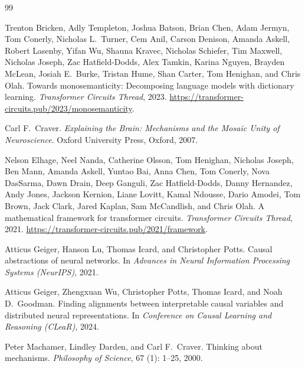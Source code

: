 \documentclass[11pt]{article}
\theoremstyle{remark}
\begin{document}

\begin{thebibliography}{99}

Trenton Bricken, Adly Templeton, Joshua Batson, Brian Chen, Adam Jermyn,
  Tom Conerly, Nicholas L.\ Turner, Cem Anil, Carson Denison, Amanda Askell,
  Robert Lasenby, Yifan Wu, Shauna Kravec, Nicholas Schiefer, Tim Maxwell,
  Nicholas Joseph, Zac Hatfield-Dodds, Alex Tamkin, Karina Nguyen, Brayden
  McLean, Josiah E.\ Burke, Tristan Hume, Shan Carter, Tom Henighan, and
  Chris Olah.
\newblock Towards monosemanticity: Decomposing language models with dictionary
  learning.
\newblock \emph{Transformer Circuits Thread}, 2023.
\newblock \url{https://transformer-circuits.pub/2023/monosemanticity}.

Carl F.\ Craver.
\newblock \emph{Explaining the Brain: Mechanisms and the Mosaic Unity of
  Neuroscience}.
\newblock Oxford University Press, Oxford, 2007.

Nelson Elhage, Neel Nanda, Catherine Olsson, Tom Henighan, Nicholas Joseph,
  Ben Mann, Amanda Askell, Yuntao Bai, Anna Chen, Tom Conerly, Nova DasSarma,
  Dawn Drain, Deep Ganguli, Zac Hatfield-Dodds, Danny Hernandez, Andy Jones,
  Jackson Kernion, Liane Lovitt, Kamal Ndousse, Dario Amodei, Tom Brown, Jack
  Clark, Jared Kaplan, Sam McCandlish, and Chris Olah.
\newblock A mathematical framework for transformer circuits.
\newblock \emph{Transformer Circuits Thread}, 2021.
\newblock \url{https://transformer-circuits.pub/2021/framework}.

Atticus Geiger, Hanson Lu, Thomas Icard, and Christopher Potts.
\newblock Causal abstractions of neural networks.
\newblock In \emph{Advances in Neural Information Processing Systems
  (NeurIPS)}, 2021.

Atticus Geiger, Zhengxuan Wu, Christopher Potts, Thomas Icard, and Noah D.\
  Goodman.
\newblock Finding alignments between interpretable causal variables and
  distributed neural representations.
\newblock In \emph{Conference on Causal Learning and Reasoning (CLeaR)}, 2024.

Peter Machamer, Lindley Darden, and Carl F.\ Craver.
\newblock Thinking about mechanisms.
\newblock \emph{Philosophy of Science}, 67 (1): 1--25, 2000.


\end{thebibliography}
\end{document}
